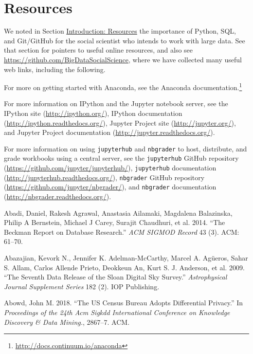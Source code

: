 \documentclass[]{krantz}
\begin{document}
\section{Resources}\label{resources-7}

We noted in Section \protect\hyperlink{chap:intro}{Introduction:
Resources} the importance of Python, SQL, and Git/GitHub for the social
scientist who intends to work with large data. See that section for
pointers to useful online resources, and also see
\url{https://github.com/BigDataSocialScience}, where we have collected
many useful web links, including the following.

For more on getting started with Anaconda, see the Anaconda
documentation.\footnote{\url{http://docs.continuum.io/anaconda}}

For more information on IPython and the Jupyter notebook server, see the
IPython site (\url{http://ipython.org/}), IPython documentation
(\url{http://ipython.readthedocs.org/}), Jupyter Project site
(\url{http://jupyter.org/}), and Jupyter Project documentation
(\url{http://jupyter.readthedocs.org/}).

For more information on using \texttt{jupyterhub} and \texttt{nbgrader}
to host, distribute, and grade workbooks using a central server, see the
\texttt{jupyterhub} GitHub repository
(\url{https://github.com/jupyter/jupyterhub/}), \texttt{jupyterhub}
documentation (\url{http://jupyterhub.readthedocs.org/}),
\texttt{nbgrader} GitHub repository
(\url{https://github.com/jupyter/nbgrader/}), and \texttt{nbgrader}
documentation (\url{http://nbgrader.readthedocs.org/}).

\hypertarget{refs}{}
\hypertarget{ref-abadi2014beckman}{}
Abadi, Daniel, Rakesh Agrawal, Anastasia Ailamaki, Magdalena Balazinska,
Philip A Bernstein, Michael J Carey, Surajit Chaudhuri, et al. 2014.
``The Beckman Report on Database Research.'' \emph{ACM SIGMOD Record} 43
(3). ACM: 61--70.

\hypertarget{ref-abazajian2009seventh}{}
Abazajian, Kevork N., Jennifer K. Adelman-McCarthy, Marcel A. Agüeros,
Sahar S. Allam, Carlos Allende Prieto, Deokkeun An, Kurt S. J. Anderson,
et al. 2009. ``The Seventh Data Release of the Sloan Digital Sky
Survey.'' \emph{Astrophysical Journal Supplement Series} 182 (2). IOP
Publishing.

\hypertarget{ref-abowed2018}{}
Abowd, John M. 2018. ``The US Census Bureau Adopts Differential
Privacy.'' In \emph{Proceedings of the 24th Acm Sigkdd International
Conference on Knowledge Discovery \& Data Mining.}, 2867--7. ACM.
\end{document}
